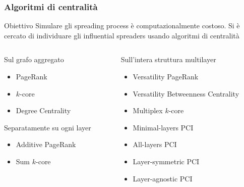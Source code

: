 \begin{frame}
    \frametitle{Algoritmi di centralità}


    \begin{alertblock}{Obiettivo}
        Simulare gli spreading process è computazionalmente costoso.
        Si è cercato di individuare gli influential spreaders usando algoritmi di centralità
    \end{alertblock}
    \begin{columns}
        \begin{column}{0.4\textwidth}
        \begin{block}{Sul grafo aggregato}
            \begin{itemize}
                \item PageRank
                \item $k$-core
                \item Degree Centrality
            \end{itemize}
        \end{block}

        \begin{block}{Separatamente su ogni layer}
            \begin{itemize}
                \item Additive PageRank
                \item Sum $k$-core
            \end{itemize}
        \end{block}
    \end{column}
    \begin{column}{0.4\textwidth}

    \begin{block}{Sull'intera struttura multilayer}
        \begin{itemize}
            \item Versatility PageRank
            \item Versatility Betweenness Centrality
            \item Multiplex $k$-core
            \item Minimal-layers PCI
            \item All-layers PCI
            \item Layer-symmetric PCI
            \item Layer-agnostic PCI
        \end{itemize}       
    \end{block}
\end{column}
\end{columns}

\end{frame}
